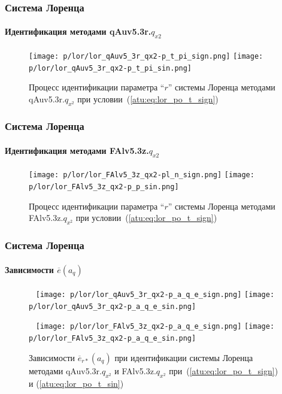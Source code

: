 \documentclass[10pt,utf8]{beamer}
\begin{document}

\begin{frame}
  \frametitle{Система Лоренца}
  \framesubtitle{Идентификация методами qAuv5.3r.$q_{x2}$}


  \begin{figure}[h!]
    \centerline{
      \texttt{[image: p/lor/lor\_qAuv5\_3r\_qx2-p\_t\_pi\_sign.png]}
      \hfill
      \texttt{[image: p/lor/lor\_qAuv5\_3r\_qx2-p\_t\_pi\_sin.png]}
    }
    \caption{Процесс идентификации параметра ``$r$'' системы Лоренца методами qAuv5.3r.$q_{x^2}$ при условии~(\ref{atu:eq:lor_po_t_sign})}
    \label{atu:f:lor_id_qAuv5.3r.q_x2_sign}
  \end{figure}

\end{frame}




\begin{frame}
  \frametitle{Система Лоренца}
  \framesubtitle{Идентификация методами FAlv5.3z.$q_{x2}$}


  \begin{figure}[h!]
    \centerline{
      \texttt{[image: p/lor/lor\_FAlv5\_3z\_qx2-pl\_n\_sign.png]}
      \hfill
      \texttt{[image: p/lor/lor\_FAlv5\_3z\_qx2-p\_p\_sin.png]}
    }
    \caption{Процесс идентификации параметра ``$r$'' системы Лоренца методами FAlv5.3z.$q_{x^2}$ при условии~(\ref{atu:eq:lor_po_t_sign})}
    \label{atu:f:lor_id_FAlv5.3z.q_x2_sign}
  \end{figure}


\end{frame}




\begin{frame}
  \frametitle{Система Лоренца}
  \framesubtitle{Зависимости $\overline{e}(a_q)$}

  \begin{figure}[h!]
    \centerline{
      {~}\hfill
      \texttt{[image: p/lor/lor\_qAuv5\_3r\_qx2-p\_a\_q\_e\_sign.png]}
      \hfill
      \texttt{[image: p/lor/lor\_qAuv5\_3r\_qx2-p\_a\_q\_e\_sin.png]}
      \hfill{~}
    }
    \centerline{
      {~}\hfill
      \texttt{[image: p/lor/lor\_FAlv5\_3z\_qx2-p\_a\_q\_e\_sign.png]}
      \hfill
      \texttt{[image: p/lor/lor\_FAlv5\_3z\_qx2-p\_a\_q\_e\_sin.png]}
      \hfill{~}
    }
    \caption{Зависимости $\overline{e}_{r*}(a_q)$ при идентификации системы Лоренца методами qAuv5.3r.$q_{x^2}$ и FAlv5.3z.$q_{x^2}$
     при~(\ref{atu:eq:lor_po_t_sign}) и (\ref{atu:eq:lor_po_t_sin})}
    \label{atu:f:lor_a_q_Fq.q_x2}
  \end{figure}


\end{frame}
\end{document}
